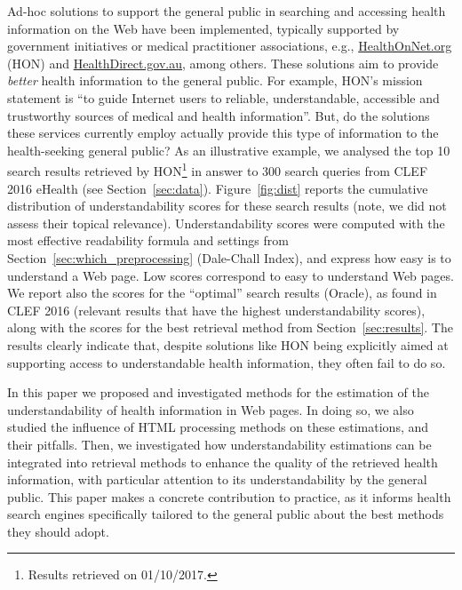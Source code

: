 Ad-hoc solutions to support the general public in searching and accessing health information on the Web have been implemented, typically supported by government initiatives or medical practitioner associations, e.g., \url{HealthOnNet.org} (HON) and \url{HealthDirect.gov.au}, among others. These solutions aim to provide \textit{better} health information to the general public. For example, HON's mission statement is ``to guide Internet users to reliable, understandable, accessible and trustworthy sources of medical and health information''. But, do the solutions these services currently employ actually provide this type of information to the health-seeking general public? As an illustrative example, we analysed the top 10 search results retrieved by HON\footnote{Results retrieved on 01/10/2017.} in answer to 300 search queries from CLEF 2016 eHealth (see Section~\ref{sec:data}). Figure~\ref{fig:dist} reports the cumulative distribution of understandability scores for these search results (note, we did not assess their topical relevance). Understandability scores were computed with the most effective readability formula and settings from Section~\ref{sec:which_preprocessing} (Dale-Chall Index), and express how easy is to understand a Web page. Low scores correspond to easy to understand Web pages. We report also the scores for the ``optimal'' search results (Oracle), as found in CLEF 2016 (relevant results that have the highest understandability scores), along with the scores for the best retrieval method from Section~\ref{sec:results}. The results clearly indicate that, despite solutions like HON being explicitly aimed at supporting access to understandable health information, they often fail to do so.

In this paper we proposed and investigated methods for the estimation of the understandability of health information in Web pages. In doing so, we also studied the influence of HTML processing methods on these estimations, and their pitfalls. Then, we investigated how understandability estimations can be integrated into retrieval methods to enhance the quality of the retrieved health information, with particular attention to its understandability by the general public. This paper makes a concrete contribution to practice, as it informs health search engines specifically tailored to the general public about the best methods they should adopt. 

